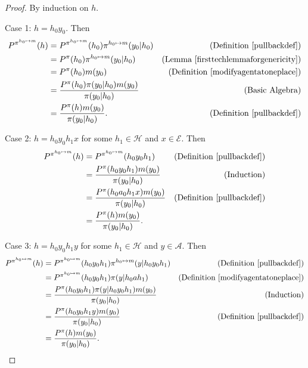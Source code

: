 \documentclass[twoside]{article}
\begin{document}
\begin{proof}
    By induction on $h$.

    Case 1: $h=h_0y_0$. Then
    \begin{align*}
        P^{\pi^{h_0\mapsto m}}(h)
        &= P^{\pi^{h_0\mapsto m}}(h_0)\pi^{h_0\mapsto m}(y_0|h_0)
            &\mbox{(Definition \ref{pullbackdef})}\\
        &= P^\pi(h_0)\pi^{h_0\mapsto m}(y_0|h_0)
            &\mbox{(Lemma \ref{firsttechlemmaforgenericity})}\\
        &= P^\pi(h_0)m(y_0)
            &\mbox{(Definition \ref{modifyagentatoneplace})}\\
        &= \frac{P^\pi(h_0)\pi(y_0|h_0)m(y_0)}{\pi(y_0|h_0)}
            &\mbox{(Basic Algebra)}\\
        &= \frac{P^\pi(h)m(y_0)}{\pi(y_0|h_0)}.
            &\mbox{(Definition \ref{pullbackdef})}
    \end{align*}

    Case 2: $h=h_0 y_0 h_1 x$ for some $h_1\in\mathcal H$
        and $x\in\mathcal E$. Then
    \begin{align*}
        P^{\pi^{h_0\mapsto m}}(h)
        &= P^{\pi^{h_0\mapsto m}}(h_0 y_0 h_1)
            &\mbox{(Definition \ref{pullbackdef})}\\
        &= \frac{P^\pi(h_0 y_0 h_1)m(y_0)}{\pi(y_0|h_0)}
            &\mbox{(Induction)}\\
        &= \frac{P^\pi(h_0 a_0 h_1 x)m(y_0)}{\pi(y_0|h_0)}
            &\mbox{(Definition \ref{pullbackdef})}\\
        &= \frac{P^\pi(h)m(y_0)}{\pi(y_0|h_0)}.
    \end{align*}

    Case 3: $h=h_0 y_0 h_1 y$ for some $h_1\in\mathcal H$ and
        $y\in\mathcal A$. Then
    \begin{align*}
        P^{\pi^{h_0\mapsto m}}(h)
        &= P^{\pi^{h_0\mapsto m}}(h_0 y_0 h_1)
            \pi^{h_0\mapsto m}(y|h_0 y_0 h_1)
            &\mbox{(Definition \ref{pullbackdef})}\\
        &= P^{\pi^{h_0\mapsto m}}(h_0 y_0 h_1)
            \pi(y|h_0 a h_1)
            &\mbox{(Definition \ref{modifyagentatoneplace})}\\
        &= \frac{P^\pi(h_0 y_0 h_1)\pi(y|h_0 y_0 h_1)m(y_0)}{\pi(y_0|h_0)}
            &\mbox{(Induction)}\\
        &= \frac{P^\pi(h_0 y_0 h_1 y)m(y_0)}{\pi(y_0|h_0)}
            &\mbox{(Definition \ref{pullbackdef})}\\
        &= \frac{P^\pi(h)m(y_0)}{\pi(y_0|h_0)}.
    \end{align*}
\end{proof}
\end{document}
